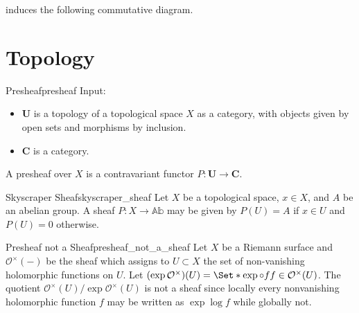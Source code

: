 \documentclass{article}
\begin{document}
induces the following commutative diagram.
\begin{center}
\end{center}

\section{Topology}

\begin{definition}{Presheaf}{presheaf}
    Input:
    \begin{itemize}
        \item $\mathbf{U}$ is a topology of a topological space $X$ as a category, with objects given by open sets and morphisms by inclusion.
        \item $\mathbf{C}$ is a category.
    \end{itemize}
    A presheaf over $X$ is a contravariant functor $P:\mathbf{U} \rightarrow \mathbf{C}$.
\end{definition}

\begin{example}{Skyscraper Sheaf}{skyscraper_sheaf}
    Let $X$ be a topological space, $x\in X$, and $A$ be an abelian group.
    A sheaf $P:X\rightarrow \mathbb{Ab}$ may be given by $P(U) = A$ if $x\in U$ and $P(U) = 0$ otherwise.
\end{example}

\begin{example}{Presheaf not a Sheaf}{presheaf_not_a_sheaf}
    Let $X$ be a Riemann surface and $\mathcal{O}^\times(-)$ be the sheaf which assigns to $U\subset X$ the set of non-vanishing holomorphic functions on $U$.
    Let $(\exp \mathcal{O}^\times)(U) = \Set*{\exp \circ f}{f\in \mathcal{O}^\times(U)}$.
    The quotient $\mathcal{O}^\times(U) / \exp \mathcal{O}^\times(U)$ is not a sheaf since locally every nonvanishing holomorphic function $f$ may be written as $\exp \log f$ while globally not.
\end{example}
\end{document}
